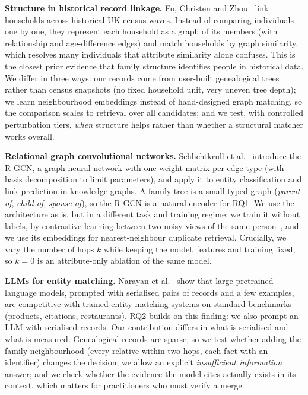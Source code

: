 \textbf{Structure in historical record linkage.}
Fu, Christen and Zhou~\cite{fu2014graph} link households across historical UK census waves. Instead of comparing individuals one by one, they represent each household as a graph of its members (with relationship and age-difference edges) and match households by graph similarity, which resolves many individuals that attribute similarity alone confuses.
This is the closest prior evidence that family structure identifies people in historical data.
We differ in three ways: our records come from user-built genealogical trees rather than census snapshots (no fixed household unit, very uneven tree depth); we learn neighbourhood embeddings instead of hand-designed graph matching, so the comparison scales to retrieval over all candidates; and we test, with controlled perturbation tiers, \emph{when} structure helps rather than whether a structural matcher works overall.

\textbf{Relational graph convolutional networks.}
Schlichtkrull et al.~\cite{schlichtkrull2018rgcn} introduce the R-GCN, a graph neural network with one weight matrix per edge type (with basis decomposition to limit parameters), and apply it to entity classification and link prediction in knowledge graphs.
A family tree is a small typed graph (\textit{parent of}, \textit{child of}, \textit{spouse of}), so the R-GCN is a natural encoder for RQ1.
We use the architecture as is, but in a different task and training regime: we train it without labels, by contrastive learning between two noisy views of the same person~\cite{chen2020simclr}, and we use its embeddings for nearest-neighbour duplicate retrieval. Crucially, we vary the number of hops $k$ while keeping the model, features and training fixed, so $k=0$ is an attribute-only ablation of the same model.

\textbf{LLMs for entity matching.}
Narayan et al.~\cite{narayan2022foundation} show that large pretrained language models, prompted with serialised pairs of records and a few examples, are competitive with trained entity-matching systems on standard benchmarks (products, citations, restaurants).
RQ2 builds on this finding: we also prompt an LLM with serialised records.
Our contribution differs in what is serialised and what is measured. Genealogical records are sparse, so we test whether adding the family neighbourhood (every relative within two hops, each fact with an identifier) changes the decision; we allow an explicit \textit{insufficient information} answer; and we check whether the evidence the model cites actually exists in its context, which matters for practitioners who must verify a merge.
